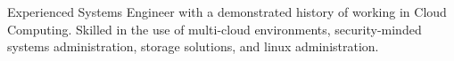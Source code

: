 
\begin{cvparagraph}

	Experienced Systems Engineer with a demonstrated history of working in Cloud Computing. Skilled in the use of multi-cloud environments, security-minded systems administration, storage solutions, and linux administration.
	
\end{cvparagraph}


